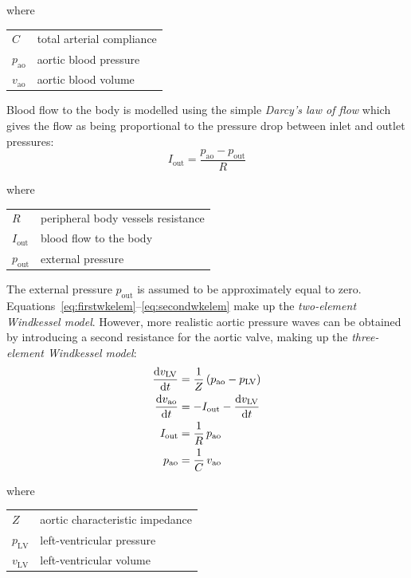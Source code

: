 \noindent
where

\vspace{0.2cm}
\begin{tabular}{ll}
    $C$ & total arterial compliance \\
    $p_{\textrm{ao}}$ & aortic blood pressure \\
    $v_{\textrm{ao}}$ & aortic blood volume \\
\end{tabular}

\vspace{0.5cm}
\noindent
Blood flow to the body is modelled using the simple \textit{Darcy's law of flow} which gives the flow as being proportional to the pressure drop between inlet and outlet pressures:
%
\begin{equation}\label{eq:secondwkelem}
    I_{\textrm{out}} = \frac{p_{\textrm{ao}}-p_{\textrm{out}}}{R} 
\end{equation}

\noindent
where

\vspace{0.2cm}
\begin{tabular}{ll}
    $R$ & peripheral body vessels resistance \\
    $I_{\textrm{out}}$ & blood flow to the body \\
    $p_{\textrm{out}}$ & external pressure \\
\end{tabular}

\vspace{0.5cm}
\noindent
The external pressure $p_{\textrm{out}}$ is assumed to be approximately equal to zero. Equations~\eqref{eq:firstwkelem}--\eqref{eq:secondwkelem} make up the \textit{two-element Windkessel model}. However, more realistic aortic pressure waves can be obtained by introducing a second resistance for the aortic valve, making up the \textit{three-element Windkessel model}:
%
\begin{align}\label{eq:windk}
    \dfrac{\mathrm{d}{v_{\textrm{LV}}}}{\mathrm{d}{t}} &= \frac{1}{Z}\,(p_{\textrm{ao}}-p_{\textrm{LV}}) \\ 
    \dfrac{\mathrm{d}{v_{\textrm{ao}}}}{\mathrm{d}{t}} &= -I_{\textrm{out}}-\dfrac{\mathrm{d}{v_{\textrm{LV}}}}{\mathrm{d}{t}} \\
    I_{\textrm{out}} &= \frac{1}{R}\,p_{\textrm{ao}} \\
    p_{\textrm{ao}} &= \frac{1}{C}\,v_{\textrm{ao}}
\end{align}

\noindent
where

\vspace{0.2cm}
\begin{tabular}{ll}
    $Z$ & aortic characteristic impedance \\
    $p_{\textrm{LV}}$ & left-ventricular pressure \\
    $v_{\textrm{LV}}$ & left-ventricular volume
\end{tabular}

